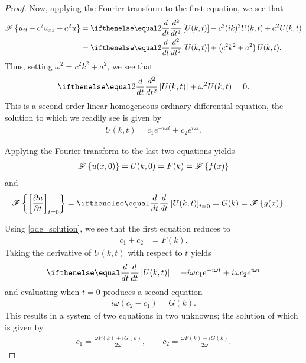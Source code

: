 \begin{proof}
  Now, applying the Fourier transform to the first equation, we see that
  \begin{align*}
    \fourier{u_{tt} - c^2 u_{xx} + a^2 u}
    &= \der{t}{2}\left[U(k,t)\right] - c^2 (ik)^2 U(k,t) + a^2 U(k,t) \\
    &= \der{t}{2}\left[U(k,t)\right] + \left(c^2k^2 + a^2\right) U(k,t).
  \end{align*}
  Thus, setting $\omega^2 =c^2k^2 + a^2$, we see that
  \begin{align*}
    \der{t}{2}\left[U(k,t)\right] + \omega^2 U(k,t) = 0.
  \end{align*}
  This is a second-order linear homogeneous ordinary differential equation, the solution to
  which we readily see is given by
  \begin{align}\label{ode_solution}
    U(k, t) = c_1 e^{-i \omega t} + c_2 e^{i \omega t}.
  \end{align}

  Applying the Fourier transform to the last two equations yields
  \begin{align*}
    \mathscr{F}\left\{ {u(x, 0)} \right\} = U(k, 0) = F(k) = \mathscr{F}\left\{ {f(x)} \right\}
  \end{align*}
  and
  \begin{align*}
    \fourier{\left[\frac{\partial u}{\partial t}\right]_{t=0}} &= \der{t}{}\left[U(k, t)\right]_{t=0} = G(k) = \fourier{g(x)}.
  \end{align*}

  Using \eqref{ode_solution}, we see that the first equation reduces to
  \begin{align*}
    c_1 + c_2 &= F(k).
  \end{align*}
  Taking the derivative of $U(k, t)$ with respect to $t$ yields
  \begin{align*}
    \der{t}{}\left[U(k, t)\right] = -i \omega c_1 e^{-i\omega t} + i\omega c_2 e^{i\omega t}
  \end{align*}
  and evaluating when $t=0$ produces a second equation
  \begin{align*}
    i\omega(c_2 - c_1) = G(k).
  \end{align*}
  This results in a system of two equations in two unknowns; the solution of which is given by
  \begin{align*}
    c_1 = \frac{\omega F(k) + i G(k)}{2\omega}, \qquad c_2 = \frac{\omega F(k) - i G(k)}{2\omega}.
  \end{align*}


\end{proof}
